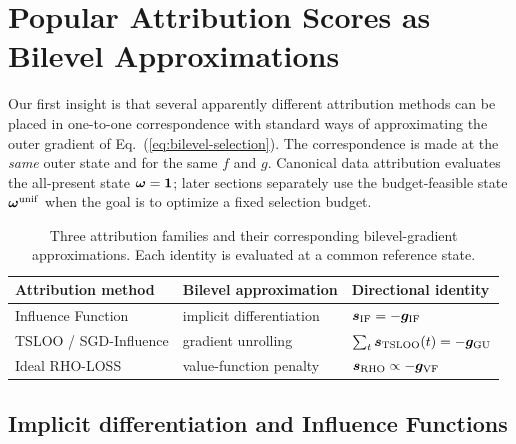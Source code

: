 \section{Popular Attribution Scores as Bilevel Approximations}
\label{sec:attribution-correspondence}

Our first insight is that several apparently different attribution methods can
be placed in one-to-one correspondence with standard ways of approximating the
outer gradient of Eq.~(\ref{eq:bilevel-selection}). The correspondence is made
at the \emph{same} outer state and for the same $f$ and $g$. Canonical data
attribution evaluates the all-present state ${\bm{\omega}}=\bm{1}$; later sections
separately use the budget-feasible state ${\bm{\omega}}^{\mathrm{unif}}$ when the
goal is to optimize a fixed selection budget.

\begin{table}[h]
\centering
\caption{Three attribution families and their corresponding bilevel-gradient
approximations. Each identity is evaluated at a common reference state.}
\label{tab:attribution-correspondence}
\small
\begin{tabularx}{\textwidth}{l l X}
\toprule
Attribution method & Bilevel approximation & Directional identity \\
\midrule
Influence Function & implicit differentiation &
$\bm{s}_{\mathrm{IF}}=-{\bm{g}}_{\mathrm{IF}}$ \\
TSLOO / SGD-Influence & gradient unrolling &
$\sum_t\bm{s}_{\mathrm{TSLOO}}(t)=-{\bm{g}}_{\mathrm{GU}}$ \\
Ideal RHO-LOSS & value-function penalty &
$\bm{s}_{\mathrm{RHO}}\propto-{\bm{g}}_{\mathrm{VF}}$ \\
\bottomrule
\end{tabularx}
\end{table}

\subsection{Implicit differentiation and Influence Functions}

